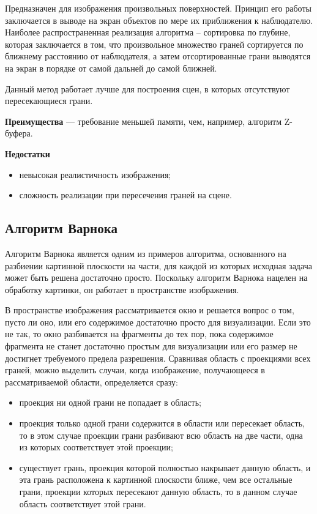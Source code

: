 Предназначен для изображения произвольных поверхностей. Принцип его работы заключается в выводе на экран объектов по мере их приближения к наблюдателю. Наиболее распространенная реализация алгоритма – сортировка по глубине, которая заключается в том, что произвольное множество граней сортируется по ближнему расстоянию от наблюдателя, а затем отсортированные грани выводятся на экран в порядке от самой дальней до самой ближней. 

Данный метод работает лучше для построения сцен, в которых отсутствуют пересекающиеся грани. 

\textbf{Преимущества} --- требование меньшей памяти, чем, например, алгоритм Z-буфера. 

\textbf{Недостатки}
\begin{itemize}[label=---]
	\item невысокая реалистичность изображения;
	\item сложность реализации при пересечения граней на сцене. 
\end{itemize}

\subsection{Алгоритм Варнока}

Алгоритм Варнока является одним из примеров алгоритма, основанного на разбиении картинной плоскости на части, для каждой из которых исходная задача может быть решена достаточно просто. Поскольку алгоритм Варнока нацелен на обработку картинки, он работает в пространстве изображения. 

В пространстве изображения рассматривается окно и решается вопрос о том, пусто ли оно, или его содержимое достаточно просто для визуализации. Если это не так, то окно разбивается на фрагменты до тех пор, пока содержимое фрагмента не станет достаточно простым для визуализации или его размер не достигнет требуемого предела разрешения. Сравнивая область с проекциями всех граней, можно выделить случаи, когда изображение, получающееся в рассматриваемой области, определяется сразу:

\begin{itemize}[label=---]
	\item проекция ни одной грани не попадает в область;
	\item проекция только одной грани содержится в области или пересекает область, то в этом случае проекции грани разбивают всю область на две части, одна из которых соответствует этой проекции;
	\item существует грань, проекция которой полностью накрывает данную область, и эта грань расположена к картинной плоскости ближе, чем все остальные грани, проекции которых пересекают данную область, то в данном случае область соответствует этой грани.
\end{itemize}

